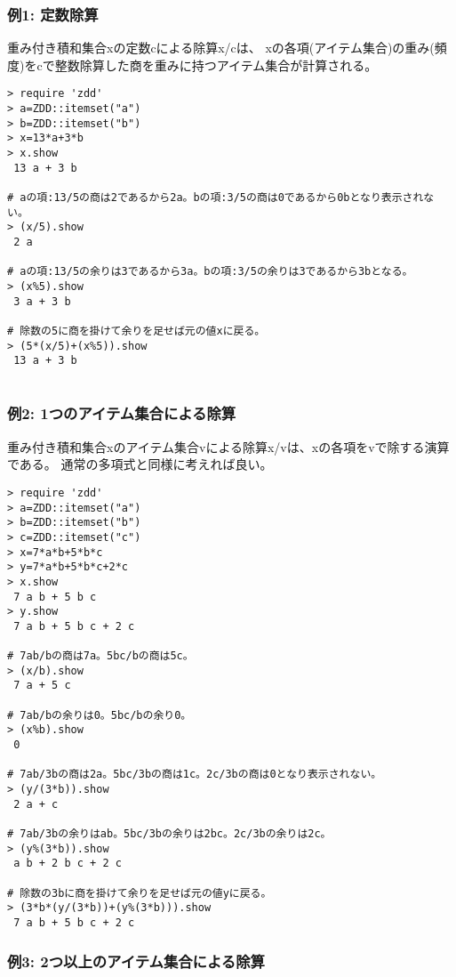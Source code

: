 \subsubsection*{例1: 定数除算}

重み付き積和集合xの定数cによる除算x/cは、
xの各項(アイテム集合)の重み(頻度)をcで整数除算した商を重みに持つアイテム集合が計算される。


\begin{Verbatim}[baselinestretch=0.7,frame=single]
> require 'zdd'
> a=ZDD::itemset("a")
> b=ZDD::itemset("b")
> x=13*a+3*b
> x.show
 13 a + 3 b

# aの項:13/5の商は2であるから2a。bの項:3/5の商は0であるから0bとなり表示されない。
> (x/5).show
 2 a

# aの項:13/5の余りは3であるから3a。bの項:3/5の余りは3であるから3bとなる。
> (x%5).show
 3 a + 3 b

# 除数の5に商を掛けて余りを足せば元の値xに戻る。
> (5*(x/5)+(x%5)).show
 13 a + 3 b


\end{Verbatim}
\subsubsection*{例2: 1つのアイテム集合による除算}

重み付き積和集合xのアイテム集合vによる除算x/vは、xの各項をvで除する演算である。
通常の多項式と同様に考えれば良い。


\begin{Verbatim}[baselinestretch=0.7,frame=single]
> require 'zdd'
> a=ZDD::itemset("a")
> b=ZDD::itemset("b")
> c=ZDD::itemset("c")
> x=7*a*b+5*b*c
> y=7*a*b+5*b*c+2*c
> x.show
 7 a b + 5 b c
> y.show
 7 a b + 5 b c + 2 c

# 7ab/bの商は7a。5bc/bの商は5c。
> (x/b).show
 7 a + 5 c

# 7ab/bの余りは0。5bc/bの余り0。
> (x%b).show
 0

# 7ab/3bの商は2a。5bc/3bの商は1c。2c/3bの商は0となり表示されない。
> (y/(3*b)).show
 2 a + c

# 7ab/3bの余りはab。5bc/3bの余りは2bc。2c/3bの余りは2c。
> (y%(3*b)).show
 a b + 2 b c + 2 c

# 除数の3bに商を掛けて余りを足せば元の値yに戻る。
> (3*b*(y/(3*b))+(y%(3*b))).show
 7 a b + 5 b c + 2 c
\end{Verbatim}
\subsubsection*{例3: 2つ以上のアイテム集合による除算}

